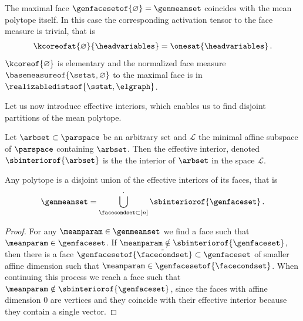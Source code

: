 \begin{example}
    \label{exa:maximalFaceMeasure}
    The maximal face $\genfacesetof{\varnothing}=\genmeanset$ coincides with the mean polytope itself.
    In this case the corresponding activation tensor to the face measure is trivial, that is
    \begin{align*}
        \kcoreofat{\varnothing}{\headvariables} = \onesat{\headvariables} \, .
    \end{align*}
    $\kcoreof{\varnothing}$ is elementary and the normalized face measure $\basemeasureof{\sstat,\varnothing}$ to the maximal face is in $\realizabledistsof{\sstat,\elgraph}$.
\end{example}



Let us now introduce effective interiors, which enables us to find disjoint partitions of the mean polytope.

\begin{definition}
    \label{def:effectiveInterior}
    Let $\arbset\subset\parspace$ be an arbitrary set and $\mathcal{L}$ the minimal affine subspace of $\parspace$ containing $\arbset$.
    Then the effective interior, denoted $\sbinteriorof{\arbset}$ is the the interior of $\arbset$ in the space $\mathcal{L}$.
\end{definition}

\begin{lemma}
    \label{lem:effectiveInteriorPolytopePartition}
    Any polytope is a disjoint union of the effective interiors of its faces, that is
    \begin{align*}
        \genmeanset = \bigcup_{\facecondset\subset[n]}^{\cdot} \sbinteriorof{\genfaceset} \, .
    \end{align*}
\end{lemma}
\begin{proof}
    For any $\meanparam\in\genmeanset$ we find a face such that $\meanparam\in\genfaceset$.
    If $\meanparam\notin\sbinteriorof{\genfaceset}$, then there is a face $\genfacesetof{\tilde{\facecondset}}\subset\genfaceset$ of smaller affine dimension such that $\meanparam\in\genfacesetof{\facecondset}$.
    When continuing this process we reach a face such that $\meanparam\notin\sbinteriorof{\genfaceset}$, since the faces with affine dimension $0$ are vertices and they coincide with their effective interior because they contain a single vector.
\end{proof}

